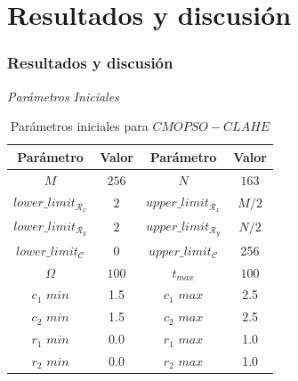 \documentclass[usenames,dvipsnames]{beamer}
\begin{document}

\section{Resultados y discusión}

\begin{frame}
\frametitle{Resultados y discusión} 
\begin{exampleblock}{\textit{Parámetros Iniciales }}

\end{exampleblock}

\begin{table}[H]
\setlength{\abovecaptionskip}{2pt plus 3pt minus 2pt} %
\caption[Parámetros de entrada para $MOPSO$]{Parámetros iniciales para $CMOPSO-CLAHE$}
\begin{center}
\begin{tabular}{||c c | c c||} 
\hline
Parámetro & Valor & Parámetro & Valor \\ [0.5ex] 
\hline\hline
$M$ & $256$ & $N$ & $163$ \\ 
\hline
$lower\_limit_{\mathscr{R}_x}$ & $2$ & $upper\_limit_{\mathscr{R}_x}$ & $M/2$ \\ 
\hline
$lower\_limit_{\mathscr{R}_y}$ & $2$ & $upper\_limit_{\mathscr{R}_y}$ & $N/2$ \\  
\hline
$lower\_limit_{{\mathscr{C}}}$ & $0$ & $upper\_limit_{{\mathscr{C}}}$ & 256 \\
\hline
$\Omega$ & $100$ & $t_{max}$ & $100$ \\ 
\hline
$c_1$ $min$ & 1.5 & $c_1$ $max$ & 2.5 \\ 
\hline
$c_2$ $min$ & 1.5 & $c_2$ $max$ & 2.5 \\ 
\hline
$r_1$ $min$ & 0.0 & $r_1$ $max$ & 1.0 \\ 
\hline
$r_2$ $min$ & 0.0 & $r_2$ $max$ & 1.0 \\
\hline
\end{tabular}
\end{center}
\label{table:parametrospso}
\end{table}

\end{frame}
\end{document}
